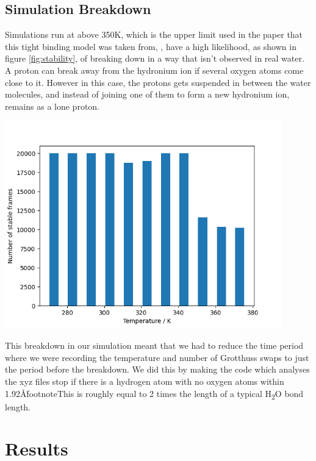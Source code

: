 \documentclass{article}
\newenvironment{Figure}{\par\medskip\noindent\minipage{\linewidth}}{\endminipage\par\medskip}
\begin{document}
\begin{multicols}{2}
\subsection{Simulation Breakdown}
\label{sec:breakdown}
Simulations run at above 350K, which is the upper limit used in the paper that this tight binding model was taken from, \cite{Lozovoi2014}, have a high likelihood, as shown in figure \ref{fig:stability}, of breaking down in a way that isn't observed in real water.\cite{bell2013proton} A proton can break away from the hydronium ion if several oxygen atoms come close to it. However in this case, the protons gets suspended in between the water molecules, and instead of joining one of them to form a new hydronium ion, remains as a lone proton.
\begin{Figure}
	\centering
	\includegraphics[width=0.9\textwidth]{figures/stability.png}
	\label{fig:stability}	
\end{Figure}

This breakdown in our simulation meant that we had to reduce the time period where we were recording the temperature and number of Grotthuss swaps to just the period before the breakdown. We did this by making the code which analyses the xyz files stop if there is a hydrogen atom with no oxygen atoms within 1.92\AA\.footnote{This is roughly equal to 2 times the length of a typical H\textsubscript{2}O bond length.}

\section{Results}

\end{multicols}
\end{document}
